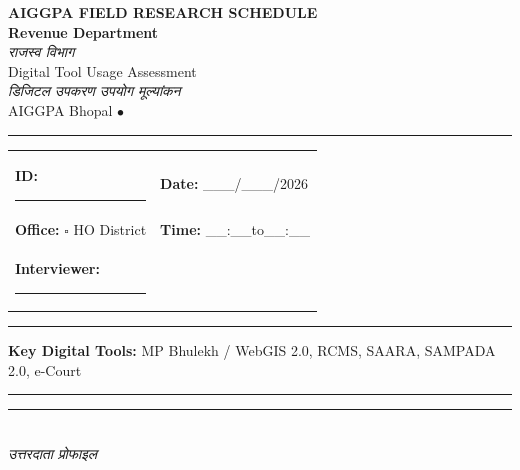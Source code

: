 \documentclass[10pt,a4paper]{article}
\newcommand{\blank}{\rule{7cm}{0.4pt}}
\begin{document}
\begin{center}
{\Large\bfseries AIGGPA FIELD RESEARCH SCHEDULE}\\[1pt]
{\large\bfseries Revenue Department}\\[1pt]
{\hindifont\itshape\color{black!70} राजस्व विभाग}\\[4pt]
{\small Digital Tool Usage Assessment}\\[1pt]
{\small\hindifont\itshape\color{black!70} डिजिटल उपकरण उपयोग मूल्यांकन}\\[3pt]
{\small AIGGPA Bhopal \quad$\bullet$}
\end{center}
\vspace{4pt}\noindent\rule{\textwidth}{1pt}\vspace{4pt}
\noindent\begin{tabularx}{\textwidth}{@{}L{9.5cm} X@{}}
\textbf{ID:} \blank & \textbf{Date:} \_\_\_/\_\_\_/2026 \\[4pt]
\textbf{Office:} {\Large$\square$} HO\quad{\Large$\square$} District & \textbf{Time:} \_\_:\_\_\quad to\quad\_\_:\_\_ \\[4pt]
\textbf{Interviewer:} \blank & \\
\end{tabularx}
\vspace{4pt}\noindent\rule{\textwidth}{0.5pt}\vspace{4pt}
\noindent\textbf{Key Digital Tools:} MP Bhulekh / WebGIS 2.0, RCMS, SAARA, SAMPADA 2.0, e-Court
\vspace{3pt}\noindent\rule{\textwidth}{0.5pt}
\noindent\rule{\textwidth}{0.3pt}\vspace{3pt}
\\
{\hindifont\itshape\color{black!70} उत्तरदाता प्रोफाइल}\vspace{3pt}
\end{document}
